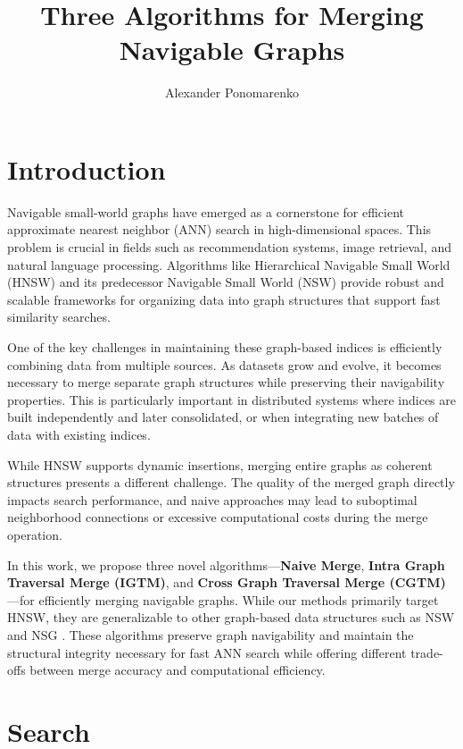 \documentclass{article}
\title{Three Algorithms for Merging Navigable Graphs}
\author[1]{Alexander Ponomarenko}
\date{}
\affil[1]{HSE Univerity}
\begin{document}
\maketitle

\section{Introduction}
Navigable small-world graphs have emerged as a cornerstone for efficient approximate nearest neighbor (ANN) search in high-dimensional spaces. This problem is crucial in fields such as recommendation systems, image retrieval, and natural language processing. Algorithms like Hierarchical Navigable Small World (HNSW) \cite{hnsw} and its predecessor Navigable Small World (NSW) \cite{nsw2011,nsw2012,nsw2014} provide robust and scalable frameworks for organizing data into graph structures that support fast similarity searches.

One of the key challenges in maintaining these graph-based indices is efficiently combining data from multiple sources. As datasets grow and evolve, it becomes necessary to merge separate graph structures while preserving their navigability properties. This is particularly important in distributed systems where indices are built independently and later consolidated, or when integrating new batches of data with existing indices.

While HNSW supports dynamic insertions, merging entire graphs as coherent structures presents a different challenge. The quality of the merged graph directly impacts search performance, and naive approaches may lead to suboptimal neighborhood connections or excessive computational costs during the merge operation.

In this work, we propose three novel algorithms—\textbf{Naive Merge}, \textbf{Intra Graph Traversal Merge (IGTM)}, and \textbf{Cross Graph Traversal Merge (CGTM)}—for efficiently merging navigable graphs. While our methods primarily target HNSW, they are generalizable to other graph-based data structures such as NSW \cite{nsw2011} and NSG \cite{NSG}. These algorithms preserve graph navigability and maintain the structural integrity necessary for fast ANN search while offering different trade-offs between merge accuracy and computational efficiency.

\section{Search}
\end{document}
